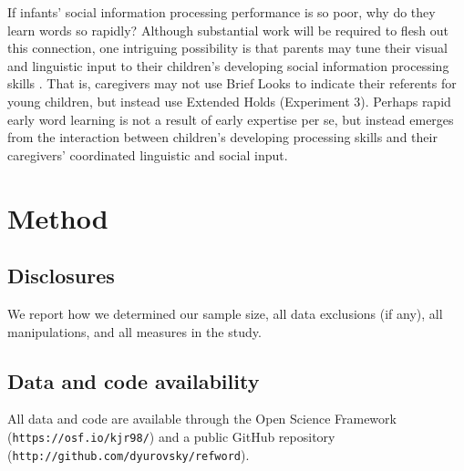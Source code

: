\documentclass[jou,floatsintext]{apa6}
\begin{document}
If infants' social information processing performance is so poor, why do they learn words so rapidly? Although substantial work will be required to flesh out this connection, one intriguing possibility is that parents may tune their visual and linguistic input to their children's developing social information processing skills \cite{snow1972,gogate2000,brand2002}. That is, caregivers may not use Brief Looks to indicate their referents for young children, but instead use Extended Holds (Experiment 3). Perhaps rapid early word learning is not a result of early expertise per se, but instead emerges from the interaction between children's developing processing skills and their caregivers' coordinated linguistic and social input.

\section{Method}

\setlength{\parskip}{0em}

\subsection{Disclosures} We report how we determined our sample size, all data exclusions (if any), all manipulations, and all measures in the study.

\subsection{Data and code availability} All data and code are available through the Open Science Framework (\small{\tt{https://osf.io/kjr98/}}) and a public GitHub repository (\small{\tt{http://github.com/dyurovsky/refword}}).
\end{document}
